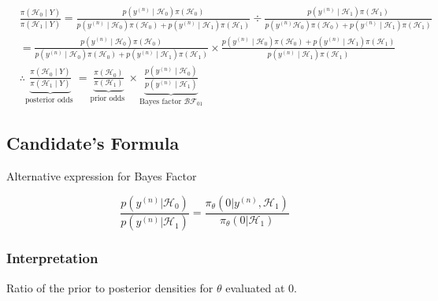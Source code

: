 \documentclass[11pt]{article}
\begin{document}
$$
\begin{aligned}
& \frac{\pi\left(\mathcal{H}_{0} \mid Y\right)}{\pi\left(\mathcal{H}_{1} \mid Y\right)}=\frac{p\left(y^{(n)} \mid \mathcal{H}_{0}\right) \pi\left(\mathcal{H}_{0}\right)}{p\left(y^{(n)} \mid \mathcal{H}_{0}\right) \pi\left(\mathcal{H}_{0}\right)+p\left(y^{(n)} \mid \mathcal{H}_{1}\right) \pi\left(\mathcal{H}_{1}\right)} \div \frac{p\left(y^{(n)} \mid \mathcal{H}_{1}\right) \pi\left(\mathcal{H}_{1}\right)}{p\left(y^{(n)} \mathcal{H}_{0}\right) \pi\left(\mathcal{H}_{0}\right)+p\left(y^{(n)} \mid \mathcal{H}_{1}\right) \pi\left(\mathcal{H}_{1}\right)} \\
& =\frac{p\left(y^{(n)} \mid \mathcal{H}_{0}\right) \pi\left(\mathcal{H}_{0}\right)}{p\left(y^{(n)} \mid \mathcal{H}_{0}\right) \pi\left(\mathcal{H}_{0}\right)+p\left(y^{(n)} \mid \mathcal{H}_{1}\right) \pi\left(\mathcal{H}_{1}\right)} \times \frac{p\left(y^{(n)} \mid \mathcal{H}_{0}\right) \pi\left(\mathcal{H}_{0}\right)+p\left(y^{(n)} \mid \mathcal{H}_{1}\right) \pi\left(\mathcal{H}_{1}\right)}{p\left(y^{(n)} \mid \mathcal{H}_{1}\right) \pi\left(\mathcal{H}_{1}\right)} \\
& \therefore \underbrace{\frac{\pi\left(\mathcal{H}_{0} \mid Y\right)}{\pi\left(\mathcal{H}_{1} \mid Y\right)}}_{\text {posterior odds }}=\underbrace{\frac{\pi\left(\mathcal{H}_{0}\right)}{\pi\left(\mathcal{H}_{1}\right)}}_{\text {prior odds }} \times \underbrace{\frac{p\left(y^{(n)} \mid \mathcal{H}_{0}\right)}{p\left(y^{(n)} \mid \mathcal{H}_{1}\right)}}_{\text {Bayes factor } \mathcal{B} \mathcal{F}_{01}}
\end{aligned}
$$

\subsection{Candidate's Formula}

Alternative expression for Bayes Factor

\begin{equation}
    \frac{p(y^{(n)}| \mathcal{H}_0)}{p(y^{(n)}| \mathcal{H}_1)} = \frac{\pi_{\theta}(0 | y^{(n)}, \mathcal{H}_1)}{\pi_{\theta}(0 | \mathcal{H}_1)}
\end{equation}

\noindent
\subsubsection{Interpretation} 
Ratio of the prior to posterior densities for $\theta$ evaluated at 0.
\end{document}
